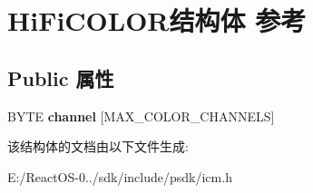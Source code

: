 \hypertarget{struct_hi_fi_c_o_l_o_r}{}\section{Hi\+Fi\+C\+O\+L\+O\+R结构体 参考}
\label{struct_hi_fi_c_o_l_o_r}
\subsection*{Public 属性}
\begin{DoxyCompactItemize}
\item 
\mbox{\label{struct_hi_fi_c_o_l_o_r_a5f9dc4f68977bef4ad0c5817362eb335}} 
B\+Y\+TE {\bfseries channel} \mbox{[}M\+A\+X\+\_\+\+C\+O\+L\+O\+R\+\_\+\+C\+H\+A\+N\+N\+E\+LS\mbox{]}
\end{DoxyCompactItemize}


该结构体的文档由以下文件生成\+:\begin{DoxyCompactItemize}
\item 
E\+:/\+React\+O\+S-\/0../sdk/include/psdk/icm.\+h\end{DoxyCompactItemize}
